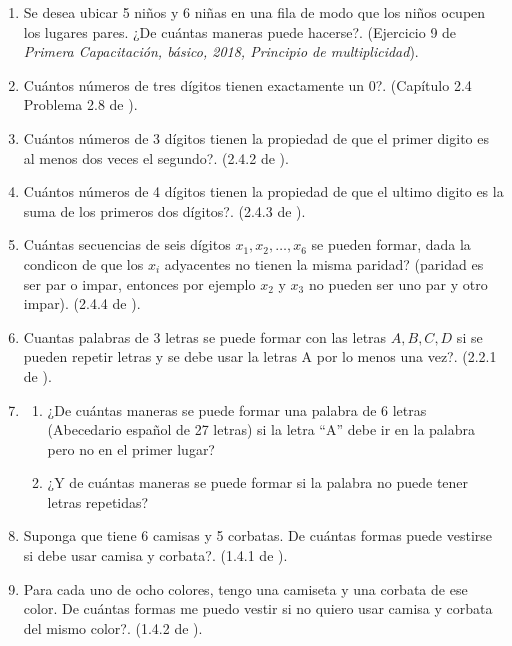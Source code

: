 \begin{enumerate}
	\item Se desea ubicar 5 niños y 6 niñas en una fila de modo que los niños ocupen los lugares pares. ¿De cuántas maneras puede hacerse?. (Ejercicio 9 de \textit{Primera Capacitación, básico, 2018, Principio de multiplicidad}).
	
	\item Cuántos números de tres dígitos tienen exactamente un 0?. (Capítulo 2.4 Problema 2.8 de \cite{ICP_Aops}).
	
	\item Cuántos números de 3 dígitos tienen la propiedad de que el primer digito es al menos dos veces el segundo?. (2.4.2 de  \cite{ICP_Aops}).
	
	\item Cuántos números de 4 dígitos tienen la propiedad de que el ultimo digito es la suma de los primeros dos dígitos?. (2.4.3 de  \cite{ICP_Aops}).
	
	\item 	Cuántas secuencias de seis dígitos $x_1,x_2,…,x_6$ se pueden formar, dada la condicon de que los $x_i$ adyacentes no tienen la misma paridad? (paridad es ser par o impar, entonces por ejemplo $x_2$ y $x_3$ no pueden ser uno par y otro impar). (2.4.4 de  \cite{ICP_Aops}).
	
	\item Cuantas palabras de 3 letras se puede formar con las letras $A,B,C,D$ si se pueden repetir letras y se debe usar la letras A por lo menos una vez?. (2.2.1 de  \cite{ICP_Aops}).
	
	\item 
	\begin{enumerate}
		\item ¿De cuántas maneras se puede formar una palabra de 6 letras (Abecedario español de 27 letras) si la letra “A” debe ir en la palabra pero no en el primer lugar?
		\item ¿Y de cuántas maneras se puede formar si la palabra no puede tener letras repetidas?
	\end{enumerate}
	
	\item Suponga que tiene 6 camisas y 5 corbatas. De cuántas formas puede vestirse si debe usar camisa y corbata?. (1.4.1 de  \cite{ICP_Aops}).
	
	\item Para cada uno de ocho colores, tengo una camiseta y una corbata de ese color. De cuántas formas me puedo vestir si no quiero usar camisa y corbata del mismo color?. (1.4.2 de  \cite{ICP_Aops}).
	

\end{enumerate}
